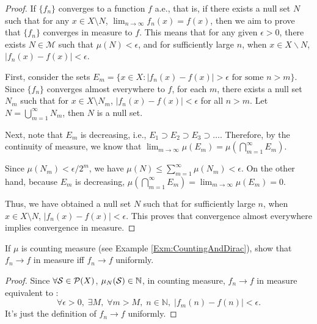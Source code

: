\begin{proof}
    If $\{f_n\}$ converges to a function $f$ a.e., 
    that is, if there exists a null set $N$ such that for any 
    $x \in X\setminus N$, $\lim_{n \to \infty} f_n(x) = f(x)$, 
    then we aim to prove that $\{f_n\}$ converges in measure to $f$. 
    This means that for any given $\epsilon > 0$, 
    there exists $N \in \mathcal{M}$ such that $\mu(N) < \epsilon$, 
    and for sufficiently large $n$, when $x \in X\backslash N$, 
    $|f_n(x) - f(x)| < \epsilon$.

    First, consider the sets $E_m = \{x \in X : |f_n(x) - f(x)| > 
    \epsilon \text{ for some } n > m\}$. Since $\{f_n\}$ converges 
    almost everywhere to $f$, for each $m$, there exists a null set 
    $N_m$ such that for $x \in X\setminus N_m$, $|f_n(x) - f(x)| < 
    \epsilon$ for all $n > m$. Let $N = \bigcup_{m=1}^\infty N_m$, 
    then $N$ is a null set.

    Next, note that $E_m$ is decreasing, i.e., $E_1 \supset E_2 
    \supset E_3 \supset \dots$. Therefore, by the continuity of measure, 
    we know that $\lim_{m \to \infty} \mu(E_m) = \mu(\bigcap_{m=1}^\infty
    E_m)$.

    Since $\mu(N_m) < \epsilon/2^m$, we have $\mu(N) \leq 
    \sum_{m=1}^\infty \mu(N_m) < \epsilon$. On the other hand, 
    because $E_m$ is decreasing, $\mu(\bigcap_{m=1}^\infty E_m) = 
    \lim_{m \to \infty} \mu(E_m) = 0$.

    Thus, we have obtained a null set $N$ such that for sufficiently 
    large $n$, when $x \in X\setminus N$, $|f_n(x) - f(x)| < \epsilon$. 
    This proves that convergence almost everywhere implies convergence 
    in measure.
\end{proof}
\begin{exc}
    If $\mu$ is counting measure 
    (see Example \ref{Exm:CountingAndDirac}), show that 
    $f_{n}\rightarrow f$ in measure iff $f_{n}\rightarrow f$ uniformly.
\end{exc}
\begin{proof}
    Since $\forall\mathcal{S}\in\mathcal{P}(X)$, 
    $\mu_{N}(\mathcal{S})\in\mathbb{N}$, 
    in counting measure, $f_n\rightarrow f$ in measure equivalent to :
    \begin{displaymath}
        \forall \epsilon>0,\;\exists M,\;\forall m>M,\;n\in\mathbb{N},\;
        |f_{m}(n)-f(n)|<\epsilon.
    \end{displaymath}
    It's just the definition of $f_{n}\rightarrow f$ uniformly.
\end{proof}
